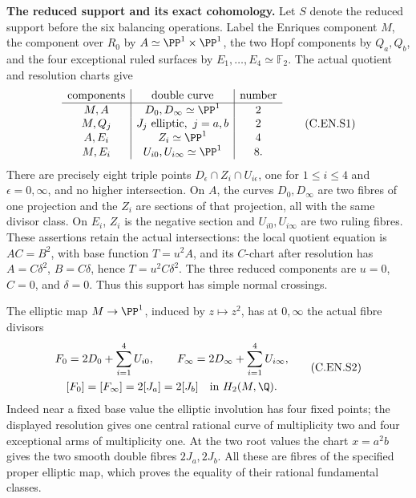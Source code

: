 \par\medskip\noindent\textbf{The reduced support and its exact cohomology.}
Let $S$ denote the reduced support before the six balancing
operations. Label the Enriques component $M$, the component over
$R_0$ by $A\simeq\PP^1\times\PP^1$, the two Hopf components by
$Q_a,Q_b$, and the four exceptional ruled surfaces by
$E_1,\ldots,E_4\simeq\mathbb F_2$.
The actual quotient and resolution charts give
\[
\begin{array}{c|c|c}
\text{components}&\text{double curve}&\text{number}\\ \hline
M,A&D_0,D_\infty\simeq\PP^1&2\\
M,Q_j&J_j\text{ elliptic},\ j=a,b&2\\
A,E_i&Z_i\simeq\PP^1&4\\
M,E_i&U_{i0},U_{i\infty}\simeq\PP^1&8.
\end{array}                                                   \tag{C.EN.S1}
\]
There are precisely eight triple points
$D_\epsilon\cap Z_i\cap U_{i\epsilon}$, one for
$1\le i\le4$ and $\epsilon=0,\infty$, and no higher
intersection. On $A$, the curves $D_0,D_\infty$ are two
fibres of one projection and the $Z_i$ are sections of that
projection, all with the same divisor class. On $E_i$, $Z_i$
is the negative section and $U_{i0},U_{i\infty}$ are two
ruling fibres. These assertions retain the actual intersections:
the local quotient equation is $AC=B^2$, with base function
$T=u^2A$, and its $C$-chart after resolution has
$A=C\delta^2$, $B=C\delta$, hence $T=u^2C\delta^2$.
The three reduced components are $u=0$, $C=0$, and
$\delta=0$. Thus this support has simple normal crossings.

The elliptic map $M\to\PP^1$, induced by $z\mapsto z^2$,
has at $0,\infty$ the actual fibre divisors
\[
 \begin{gathered}
 F_0=2D_0+\sum_{i=1}^4U_{i0},\qquad
 F_\infty=2D_\infty+\sum_{i=1}^4U_{i\infty},\\
 [F_0]=[F_\infty]=2[J_a]=2[J_b]
       \quad\text{in }H_2(M,\Q).
 \end{gathered}                                          \tag{C.EN.S2}
\]
Indeed near a fixed base value the elliptic involution has
four fixed points; the displayed resolution gives one central
rational curve of multiplicity two and four exceptional arms
of multiplicity one. At the two root values the chart
$x=a^2b$ gives the two smooth double fibres $2J_a,2J_b$.
All these are fibres of the specified proper elliptic map,
which proves the equality of their rational fundamental classes.


